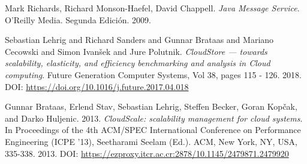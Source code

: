 \documentclass[conference]{IEEEtran}
\begin{document}
\begin{thebibliography}{00}
 Mark Richards, Richard Monson-Haefel, David Chappell. \emph{Java Message Service}. O'Reilly Media. Segunda Edición. 2009.

 Sebastian Lehrig and Richard Sanders and Gunnar Brataas and Mariano Cecowski and Simon Ivanšek and Jure Polutnik. \emph{CloudStore — towards scalability, elasticity, and efficiency benchmarking and analysis in Cloud computing}. Future Generation Computer Systems, Vol 38, pages 115 - 126. 2018. DOI: \url{https://doi.org/10.1016/j.future.2017.04.018} 

 Gunnar Brataas, Erlend Stav, Sebastian Lehrig, Steffen Becker, Goran Kopčak, and Darko Huljenic. 2013. \emph{CloudScale: scalability management for cloud systems}. In Proceedings of the 4th ACM/SPEC International Conference on Performance Engineering (ICPE '13), Seetharami Seelam (Ed.). ACM, New York, NY, USA, 335-338. 2013. DOI: \url{https://ezproxy.itcr.ac.cr:2878/10.1145/2479871.2479920}

\end{thebibliography}
\end{document}
